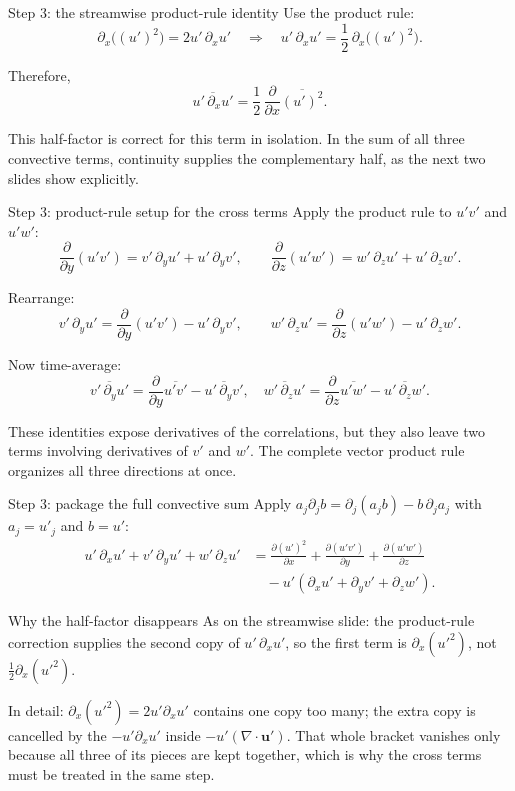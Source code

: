 \documentclass[aspectratio=169,11pt]{beamer}
\newcommand{\uu}{\bm{u}}
\newcommand{\avg}[1]{\overline{#1}}
\renewcommand{\up}{\uu'} %
\newcommand{\Div}{\nabla\cdot}
\begin{document}
\begin{frame}{Step 3: the streamwise product-rule identity}
Use the product rule:
\[
\partial_x\big((u')^2\big)=2u'\,\partial_x u'
\quad\Rightarrow\quad
u'\,\partial_x u'=\frac12\,\partial_x\big((u')^2\big).
\]

Therefore,
\[
\avg{u'\,\partial_x u'}
=
\frac12\,\frac{\partial}{\partial x}\avg{(u')^2}.
\]

This half-factor is correct for this term in isolation. In the sum of all three convective terms, continuity supplies the complementary half, as the next two slides show explicitly.
\end{frame}

\begin{frame}{Step 3: product-rule setup for the cross terms}
Apply the product rule to $u'v'$ and $u'w'$:
\[
\frac{\partial}{\partial y}(u'v') = v'\,\partial_y u' + u'\,\partial_y v',
\qquad
\frac{\partial}{\partial z}(u'w') = w'\,\partial_z u' + u'\,\partial_z w'.
\]

Rearrange:
\[
v'\,\partial_y u' = \frac{\partial}{\partial y}(u'v') - u'\,\partial_y v',
\qquad
w'\,\partial_z u' = \frac{\partial}{\partial z}(u'w') - u'\,\partial_z w'.
\]

Now time-average:
\[
\avg{v'\,\partial_y u'} = \frac{\partial}{\partial y}\avg{u'v'} - \avg{u'\,\partial_y v'},\quad
\avg{w'\,\partial_z u'} = \frac{\partial}{\partial z}\avg{u'w'} - \avg{u'\,\partial_z w'}.
\]

These identities expose derivatives of the correlations, but they also leave two terms involving derivatives of $v'$ and $w'$. The complete vector product rule organizes all three directions at once.
\end{frame}

\begin{frame}{Step 3: package the full convective sum}
Apply $a_j\partial_j b=\partial_j(a_jb)-b\,\partial_j a_j$ with $a_j=u'_j$ and $b=u'$:
\begin{align*}
u'\,\partial_x u'+v'\,\partial_y u'+w'\,\partial_z u'
&=\frac{\partial (u')^2}{\partial x}
 +\frac{\partial (u'v')}{\partial y}
 +\frac{\partial (u'w')}{\partial z}\\
&\quad-u'\left(\partial_x u'+\partial_y v'+\partial_z w'\right).
\end{align*}

\begin{block}{Why the half-factor disappears}
As on the streamwise slide: the product-rule correction supplies the second copy of $u'\,\partial_x u'$, so the first term is $\partial_x(u'^2)$, not $\tfrac12\partial_x(u'^2)$.
\end{block}
{\small In detail: $\partial_x(u'^2)=2u'\partial_xu'$ contains one copy too many; the extra copy is cancelled by the $-u'\partial_xu'$ inside $-u'(\Div\up)$. That whole bracket vanishes only because all three of its pieces are kept together, which is why the cross terms must be treated in the same step.\par}
\end{frame}
\end{document}
